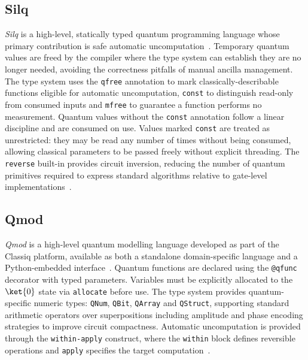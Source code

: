 \subsection{Silq}\label{subsec:pub_qpl_review:language_descriptions:silq}
\textit{Silq} is a high-level, statically typed quantum programming language whose primary contribution is safe automatic uncomputation~\cite{bichsel2020silq}.
Temporary quantum values are freed by the compiler where the type system can establish they are no longer needed, avoiding the correctness pitfalls of manual ancilla management.
The type system uses the \texttt{qfree} annotation to mark classically-describable functions eligible for automatic uncomputation, \texttt{const} to distinguish read-only from consumed inputs and \texttt{mfree} to guarantee a function performs no measurement.
Quantum values without the \texttt{const} annotation follow a linear discipline and are consumed on use.
Values marked \texttt{const} are treated as unrestricted: they may be read any number of times without being consumed, allowing classical parameters to be passed freely without explicit threading.
The \texttt{reverse} built-in provides circuit inversion, reducing the number of quantum primitives required to express standard algorithms relative to gate-level implementations~\cite{bichsel2020silq}.

\subsection{Qmod}\label{subsec:pub_qpl_review:language_descriptions:qmod}
\textit{Qmod} is a high-level quantum modelling language developed as part of the Classiq platform, available as both a standalone domain-specific language and a Python-embedded interface~\cite{vax2025qmodexpressivehighlevelquantum}.
Quantum functions are declared using the \texttt{@qfunc} decorator with typed parameters.
Variables must be explicitly allocated to the $\ket{0}$ state via \texttt{allocate} before use.
The type system provides quantum-specific numeric types: \texttt{QNum}, \texttt{QBit}, \texttt{QArray} and \texttt{QStruct}, supporting standard arithmetic operators over superpositions including amplitude and phase encoding strategies to improve circuit compactness.
Automatic uncomputation is provided through the \texttt{within-apply} construct, where the \texttt{within} block defines reversible operations and \texttt{apply} specifies the target computation~\cite{vax2025qmodexpressivehighlevelquantum}.

